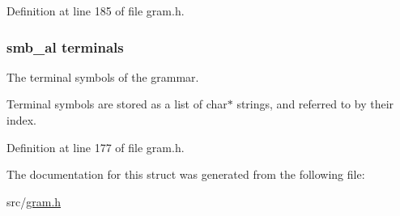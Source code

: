 \-Definition at line 185 of file gram.\-h.

\hypertarget{structcnf_ae85a135e82c4af0e75739a21b3ec03b4}{
\subsubsection[{terminals}]{\setlength{\rightskip}{0pt plus 5cm}smb\-\_\-al {\bf terminals}}}\label{structcnf_ae85a135e82c4af0e75739a21b3ec03b4}


\-The terminal symbols of the grammar. 

\-Terminal symbols are stored as a list of char$\ast$ strings, and referred to by their index. 

\-Definition at line 177 of file gram.\-h.



\-The documentation for this struct was generated from the following file\-:\begin{DoxyCompactItemize}
\item 
src/\hyperlink{gram_8h}{gram.\-h}\end{DoxyCompactItemize}
